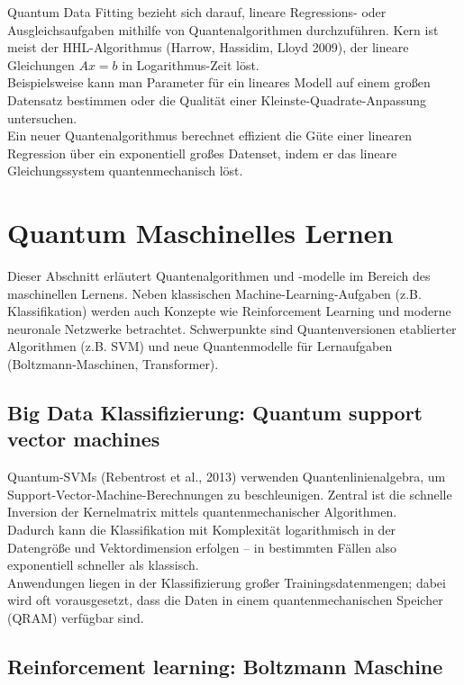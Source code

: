 Quantum Data Fitting bezieht sich darauf, lineare Regressions- oder Ausgleichsaufgaben mithilfe von Quantenalgorithmen durchzuführen. Kern ist meist der HHL-Algorithmus (Harrow, Hassidim, Lloyd 2009), der lineare Gleichungen $Ax=b$ in Logarithmus-Zeit löst.\\
Beispielsweise kann man Parameter für ein lineares Modell auf einem großen Datensatz bestimmen oder die Qualität einer Kleinste-Quadrate-Anpassung untersuchen.\\
Ein neuer Quantenalgorithmus berechnet effizient die Güte einer linearen Regression über ein exponentiell großes Datenset, indem er das lineare Gleichungssystem quantenmechanisch löst.

\section{Quantum Maschinelles Lernen}
Dieser Abschnitt erläutert Quantenalgorithmen und -modelle im Bereich des maschinellen Lernens. Neben klassischen Machine-Learning-Aufgaben (z.B. Klassifikation) werden auch Konzepte wie Reinforcement Learning und moderne neuronale Netzwerke betrachtet. Schwerpunkte sind Quantenversionen etablierter Algorithmen (z.B. SVM) und neue Quantenmodelle für Lernaufgaben (Boltzmann-Maschinen, Transformer).

\subsection{Big Data Klassifizierung: Quantum support vector machines}

Quantum-SVMs (Rebentrost et al., 2013) verwenden Quantenlinienalgebra, um Support-Vector-Machine-Berechnungen zu beschleunigen. Zentral ist die schnelle Inversion der Kernelmatrix mittels quantenmechanischer Algorithmen.\\
Dadurch kann die Klassifikation mit Komplexität logarithmisch in der Datengröße und Vektordimension erfolgen – in bestimmten Fällen also exponentiell schneller als klassisch.\\
Anwendungen liegen in der Klassifizierung großer Trainingsdatenmengen; dabei wird oft vorausgesetzt, dass die Daten in einem quantenmechanischen Speicher (QRAM) verfügbar sind.

\subsection{Reinforcement learning: Boltzmann Maschine}

